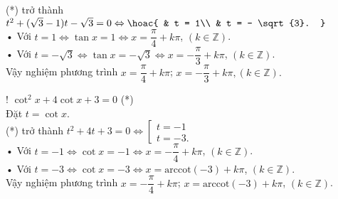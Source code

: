 \begin{vd}
{\begin{listEX}[2]
			(*) trở thành $ t^2 + (\sqrt{3}  - 1)t - \sqrt{3}  = 0 \Leftrightarrow \hoac{
				& t = 1\\
				& t =  - \sqrt{3}.
			}$ \\
			• Với $t=1\Leftrightarrow \tan x=1\Leftrightarrow x=\dfrac{\pi}{4}+k\pi$, $( k\in \mathbb{Z})$.\\
			• Với $t=-\sqrt{3}\Leftrightarrow 
			\tan x=-\sqrt{3}\Leftrightarrow x=-\dfrac{\pi}{3}+k\pi$, 
			$( k\in \mathbb{Z} )$. \\
			Vậy nghiệm phương trình  $x=\dfrac{\pi}{4}+k\pi $; $x=-\dfrac{\pi}{3}+k\pi,( k\in \mathbb{Z}).$ 
			\item! $\cot^2x + 4\cot x + 3 = 0$ (*)\\
			Đặt $t = \cot x$. \\
			(*) trở thành $ t^2 + 4t + 3 = 0 \Leftrightarrow 
			\left[\begin{array}{l}
				t =  - 1\\
				t =  - 3.
			\end{array} \right.$ \\
			• Với $t=-1\Leftrightarrow \cot x=-1\Leftrightarrow x=-\dfrac{\pi}{4}+k\pi$, $( k\in \mathbb{Z})$. \\
			• Với $t=-3\Leftrightarrow \cot x=-3\Leftrightarrow x=\text{arccot}(-3)+k\pi$, $( k\in \mathbb{Z})$.\\
			Vậy nghiệm phương trình  $x=-\dfrac{\pi}{4}+k\pi $; $x=\text{arccot}(-3)+k\pi$, $( k\in \mathbb{Z})$. 
		\end{listEX}
	}
\end{vd}
